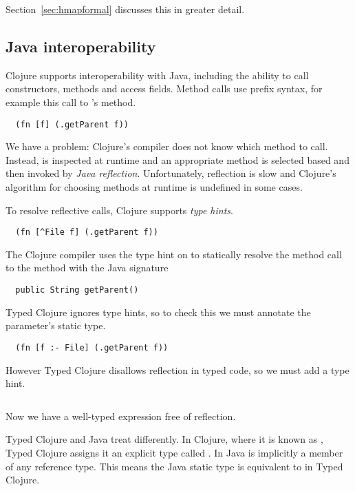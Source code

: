 Section~\ref{sec:hmapformal} discusses this in greater detail.

\subsection{Java interoperability}

Clojure supports interoperability with Java, including the ability to
call constructors, methods and access fields.
Method calls use prefix syntax, for example this call to 
's  method.

\begin{verbatim}
  (fn [f] (.getParent f))
\end{verbatim}

We have a problem: Clojure's compiler does not know which method to call.
Instead,  is inspected at runtime and an appropriate method is selected based
and then invoked by \emph{Java reflection}.
Unfortunately, reflection is slow and Clojure's algorithm for
choosing methods at runtime is undefined in some cases.

To resolve reflective calls, Clojure supports \emph{type hints}.

\begin{verbatim}
  (fn [^File f] (.getParent f))
\end{verbatim}

The Clojure compiler uses the type hint on 
to statically resolve the method call to the 
method with the Java signature

\begin{verbatim}
  public String getParent()
\end{verbatim}

Typed Clojure ignores type hints, so to check this we must
annotate the parameter's static type.

\begin{verbatim}
  (fn [f :- File] (.getParent f))
\end{verbatim}

However Typed Clojure disallows reflection in typed code, so we
must add a type hint.

\inputminted[firstline=10,lastline=10]{clojure}{code/demo/src/demo/parent3.clj}

Now we have a well-typed expression free of reflection.

Typed Clojure and Java treat  differently.
In Clojure, where it is known as , Typed Clojure assigns it an explicit type
called . In Java  is implicitly a member of any reference type.
This means the Java static type  is equivalent to
 in Typed Clojure.

